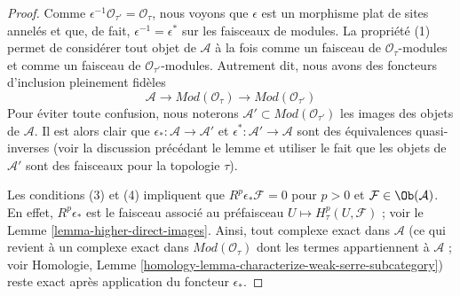 \begin{proof}
Comme $\epsilon^{-1}\mathcal{O}_{\tau'} = \mathcal{O}_\tau$, nous voyons
que $\epsilon$ est un morphisme plat de sites annelés et que, de fait,
$\epsilon^{-1} = \epsilon^*$ sur les faisceaux de modules. La propriété
(1) permet de considérer tout objet de $\mathcal{A}$ à la fois comme un
faisceau de $\mathcal{O}_\tau$-modules et comme un faisceau de
$\mathcal{O}_{\tau'}$-modules. Autrement dit, nous avons des foncteurs
d'inclusion pleinement fidèles
$$
\mathcal{A} \to \textit{Mod}(\mathcal{O}_\tau) \to
\textit{Mod}(\mathcal{O}_{\tau'})
$$
Pour éviter toute confusion, nous noterons
$\mathcal{A}' \subset \textit{Mod}(\mathcal{O}_{\tau'})$
les images des objets de $\mathcal{A}$. Il est alors clair que
$\epsilon_* : \mathcal{A} \to \mathcal{A}'$ et
$\epsilon^* : \mathcal{A}' \to \mathcal{A}$ sont
des équivalences quasi-inverses (voir la discussion précédant le lemme et
utiliser le fait que les objets de $\mathcal{A}'$ sont des faisceaux pour
la topologie $\tau$).

\medskip\noindent
Les conditions (3) et (4) impliquent que
$R^p\epsilon_*\mathcal{F} = 0$ pour $p > 0$ et
$\mathcal{F} \in \Ob(\mathcal{A})$. En effet, $R^p\epsilon_*$ est le
faisceau associé au préfaisceau $U \mapsto H^p_\tau(U, \mathcal{F})$ ;
voir le Lemme \ref{lemma-higher-direct-images}. Ainsi, tout complexe exact
dans $\mathcal{A}$ (ce qui revient à un complexe exact dans
$\textit{Mod}(\mathcal{O}_\tau)$ dont les termes appartiennent à
$\mathcal{A}$ ; voir Homologie, Lemme
\ref{homology-lemma-characterize-weak-serre-subcategory}) reste exact après
application du foncteur $\epsilon_*$.


\end{proof}
